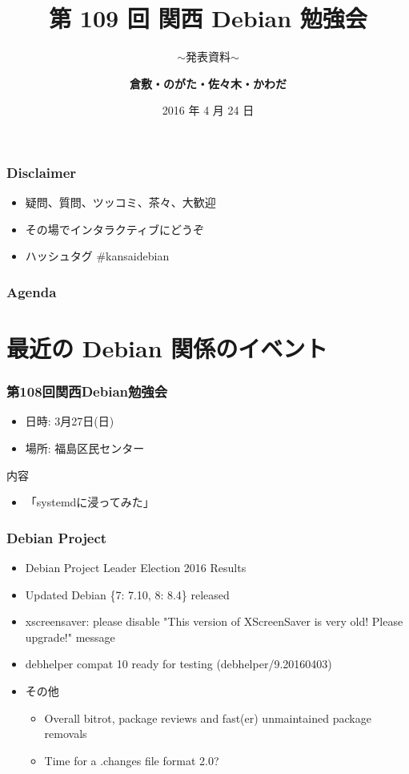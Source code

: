 \documentclass[cjk,dvipdfmx,10pt,compress,%
hyperref={bookmarks=true,bookmarksnumbered=true,bookmarksopen=false,%
colorlinks=false,%
pdftitle={第 109 回 関西 Debian 勉強会},%
pdfauthor={倉敷・のがた・佐々木・かわだ},%
pdfsubject={資料},%
}]{beamer}
\title{第 109 回 関西 Debian 勉強会}
\subtitle{$\sim$発表資料$\sim$}
\author[かわだ てつたろう]{{\large\bf 倉敷・のがた・佐々木・かわだ}}
\institute[Debian JP]{{\normalsize\tt 関西 Debian 勉強会}}
\date{{\small 2016 年 4 月 24 日}}
\begin{document}
\settitleslide
\begin{frame}
\titlepage
\end{frame}
\setdefaultslide

\begin{frame}[fragile]
  \frametitle{Disclaimer}
  \begin{itemize}
  \item 疑問、質問、ツッコミ、茶々、\alert{大歓迎}
  \item その場でインタラクティブにどうぞ
  \item ハッシュタグ \#kansaidebian
  \end{itemize}
\end{frame}

\begin{frame}[fragile]
\frametitle{Agenda}

\tableofcontents

\end{frame}

\section{最近の Debian 関係のイベント}


\begin{frame}[fragile]
  \frametitle{第108回関西Debian勉強会}
  \begin{itemize}
  \item 日時: 3月27日(日)
  \item 場所: 福島区民センター
  \end{itemize}
  \begin{block}{内容}
    \begin{itemize}
    \item 「systemdに浸ってみた」
    \end{itemize}
  \end{block}
\end{frame}

\begin{frame}[fragile]
  \frametitle{Debian Project}
  \begin{itemize}
  \item Debian Project Leader Election 2016 Results
  \item Updated Debian \{7: 7.10, 8: 8.4\} released
  \item xscreensaver: please disable "This version of XScreenSaver is very old! Please upgrade!" message
  \item debhelper compat 10 ready for testing (debhelper/9.20160403)
  \item その他
    \begin{itemize}
    \item Overall bitrot, package reviews and fast(er) unmaintained package removals
    \item Time for a .changes file format 2.0?
    \end{itemize}
  \end{itemize}
\end{frame}
\end{document}
